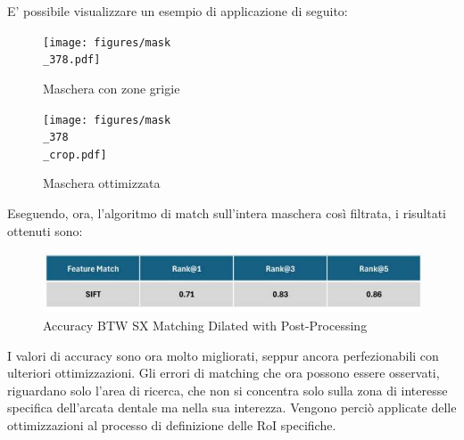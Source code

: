\documentclass[12pt,a4paper,openright,twoside]{book}
\begin{document}
\begin{itemize}
\begin{figure}[H]
    \centering
    
\end{figure}
E' possibile visualizzare un esempio di applicazione di seguito:
\begin{figure}[H]
    \centering
    \begin{minipage}{0.4\textwidth}
	\centering
    	\texttt{[image: figures/mask\\\_378.pdf]}
    	\caption{Maschera con zone grigie}
    	\label{lab:Maschera grigia}
    \end{minipage}\hfill
    \begin{minipage}{0.4\textwidth}
    	\centering
    	\texttt{[image: figures/mask\\\_378\\\_crop.pdf]}
    	\caption{Maschera ottimizzata}
    	\label{lab:Maschera ottimizzata}
    \end{minipage}\hfill
\end{figure}
\end{itemize}

Eseguendo, ora, l'algoritmo di match sull'intera maschera così filtrata, i risultati ottenuti sono:
\begin{figure}[H]
	\centering
	\includegraphics{figures/sx7.pdf}
    	\caption{Accuracy BTW SX Matching Dilated with Post-Processing}
	\label{fig:sx6}
\end{figure}

I valori di accuracy sono ora molto migliorati, seppur ancora perfezionabili con ulteriori ottimizzazioni. Gli errori di matching che ora possono essere osservati, riguardano solo l'area di ricerca, che non si concentra solo sulla zona di interesse specifica dell'arcata dentale ma nella sua interezza. Vengono perciò applicate delle ottimizzazioni al processo di definizione delle RoI specifiche.


\end{document}
